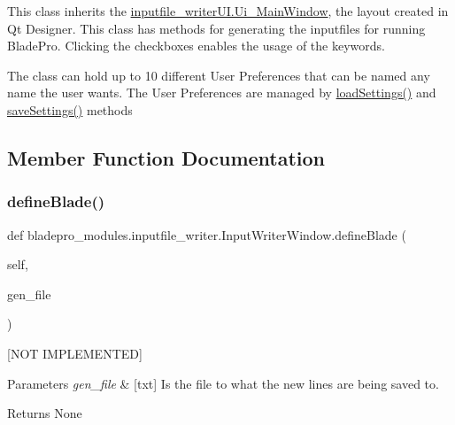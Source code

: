 This class inherits the \hyperlink{a00077}{inputfile\+\_\+writer\+U\+I.\+Ui\+\_\+\+Main\+Window}, the layout created in Qt Designer. This class has methods for generating the inputfiles for running Blade\+Pro. Clicking the checkboxes enables the usage of the keywords.

The class can hold up to 10 different User Preferences that can be named any name the user wants. The User Preferences are managed by \hyperlink{a00073_a0c4f30850537553db0ff2e27059733a4}{load\+Settings()} and \hyperlink{a00073_a723573fade09f206a9c89569885558c1}{save\+Settings()} methods 

\subsection{Member Function Documentation}
\hypertarget{a00073_abf54bdb00a2743fb488463ab7247b146}{}\label{a00073_abf54bdb00a2743fb488463ab7247b146} 
\subsubsection{\texorpdfstring{define\+Blade()}{defineBlade()}}
{\footnotesize\ttfamily def bladepro\+\_\+modules.\+inputfile\+\_\+writer.\+Input\+Writer\+Window.\+define\+Blade (\begin{DoxyParamCaption}\item[{}]{self,  }\item[{}]{gen\+\_\+file }\end{DoxyParamCaption})}



\mbox{[}N\+OT I\+M\+P\+L\+E\+M\+E\+N\+T\+ED\mbox{]} 


\begin{DoxyParams}{Parameters}
{\em gen\+\_\+file} & \mbox{[}txt\mbox{]} Is the file to what the new lines are being saved to. \\
\hline
\end{DoxyParams}
\begin{DoxyReturn}{Returns}
None 
\end{DoxyReturn}
\hypertarget{a00073_a6ec74acbc44de3023188ddd8395b5b30}{}\label{a00073_a6ec74acbc44de3023188ddd8395b5b30} 
